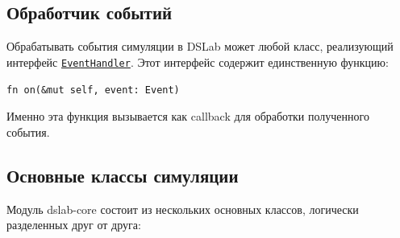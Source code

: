 \subsection{Обработчик событий} \label{EventHandler}

Обрабатывать события симуляции в DSLab может любой класс, реализующий интерфейс \underline{\texttt{EventHandler}}. Этот интерфейс содержит единственную функцию: 
\begin{center}
\texttt{fn on(\&mut self, event: Event)}
\label{fnon}
\end{center}

Именно эта функция вызывается как callback для обработки полученного события.

\subsection{Основные классы симуляции}
Модуль dslab-core состоит из нескольких основных классов, логически разделенных друг от друга:
